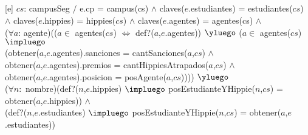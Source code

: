 \begin{Representacion}
  ~


  ~


  ~
  

  ~
  
  [e]
  {$cs$: campusSeg $/$ e.cp = campus(cs) $\land$ claves($e$.estudiantes) = estudiantes($cs$) \\ $\land$ claves($e$.hippies) = hippies($cs$) $\land$ claves($e$.agentes) = agentes(cs) $\land$ \\
  ($\forall a$: agente)(($a \in$ agentes($cs$) $\iff$ def?($a$,$e$.agentes)) $\yluego$ ($a \in$ agentes($cs$) $\impluego$ \\
  (obtener($a$,$e$.agentes).sanciones = cantSanciones($a$,$cs$) $\land$\\
  obtener($a$,$e$.agentes).premios = cantHippiesAtrapados($a$,$cs$) $\land$\\
  obtener($a$,$e$.agentes).posicion = posAgente($a$,$cs$)))) $\yluego$ \\
  ($\forall n:$ nombre)(def?($n$,$e$.hippies) $\impluego$ posEstudianteYHippie($n$,$cs$) = obtener($a$,$e$.hippies)) $\land$\\
  (def?($n$,$e$.estudiantes) $\impluego$ posEstudianteYHippie($n$,$cs$) = obtener($a$,$e$.estudiantes)) }


\end{Representacion}

